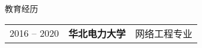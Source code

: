 \begin{rubric}{教育经历}
	\begin{tabular}{@{}p{3cm}p{4cm}p{6cm}@{}}
		2016 -- 2020 & \textbf{华北电力大学} & 网络工程专业
	\end{tabular}
\end{rubric}